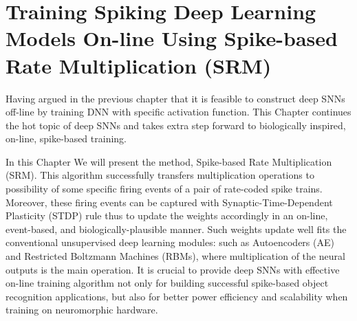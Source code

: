 \chapter{Training Spiking Deep Learning Models On-line Using Spike-based Rate Multiplication (SRM)}
\label{cha:sdlm}
Having argued in the previous chapter that it is feasible to construct deep SNNs off-line by training DNN with specific activation function.
This Chapter continues the hot topic of deep SNNs and takes extra step forward to biologically inspired, on-line, spike-based training.

In this Chapter We will present the method, Spike-based Rate Multiplication (SRM).
This algorithm successfully transfers multiplication operations to possibility of some specific firing events of a pair of rate-coded spike trains.
Moreover, these firing events can be captured with Synaptic-Time-Dependent Plasticity (STDP) rule thus to update the weights accordingly in an on-line, event-based, and biologically-plausible manner.
Such weights update well fits the conventional unsupervised deep learning modules: such as Autoencoders (AE) and Restricted Boltzmann Machines (RBMs), where multiplication of the neural outputs is the main operation.
It is crucial to provide deep SNNs with effective on-line training algorithm not only for building successful spike-based object recognition applications, but also for better power efficiency and scalability when training on neuromorphic hardware.


